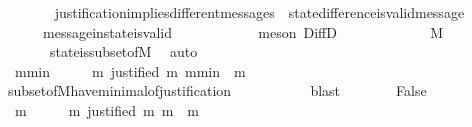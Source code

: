 \begin{isabellebody}
\ \ \ \ \ \ \isamarkupfalse%
\ justification{\isacharunderscore}implies{\isacharunderscore}different{\isacharunderscore}messages\ \ state{\isacharunderscore}difference{\isacharunderscore}is{\isacharunderscore}valid{\isacharunderscore}message\isanewline
\ \ \ \ \ \ message{\isacharunderscore}in{\isacharunderscore}state{\isacharunderscore}is{\isacharunderscore}valid\ \ {\isacartoucheopen}{\isasymsigma}{\isacharprime}\ {\isasymsubset}\ {\isasymsigma}{\isacartoucheclose}\isanewline
\ \ \ \ \ \ \isamarkupfalse%
\ {\isacharparenleft}meson\ DiffD{}\ {\isacartoucheopen}{\isasymsigma}\ {\isasymin}\ {\isasymSigma}{\isacartoucheclose}{\isacharparenright}\isanewline
\ \ \ \ \isamarkupfalse%
\ {\isachardoublequoteopen}{\isasymsigma}\ {\isacharminus}\ {\isasymsigma}{\isacharprime}\ {\isasymsubseteq}\ M{\isachardoublequoteclose}\isanewline
\ \ \ \ \ \ \isamarkupfalse%
\ {\isacartoucheopen}{\isasymsigma}\ {\isasymin}\ {\isasymSigma}{\isacartoucheclose}\ {\isacartoucheopen}{\isasymsigma}{\isacharprime}\ {\isasymsubset}\ {\isasymsigma}{\isacartoucheclose}\ state{\isacharunderscore}is{\isacharunderscore}subset{\isacharunderscore}of{\isacharunderscore}M\ \isamarkupfalse%
\ auto\isanewline
\ \ \ \ \isamarkupfalse%
\ \isamarkupfalse%
\ {\isachardoublequoteopen}{\isasymexists}\ m{\isacharunderscore}min\ {\isasymin}\ {\isasymsigma}\ {\isacharminus}\ {\isasymsigma}{\isacharprime}{\isachardot}\ {\isasymforall}\ m{\isachardot}\ justified\ m\ m{\isacharunderscore}min\ {\isasymlongrightarrow}\ m\ {\isasymnotin}\ {\isasymsigma}\ {\isacharminus}\ {\isasymsigma}{\isacharprime}{\isachardoublequoteclose}\isanewline
\ \ \ \ \ \ \isamarkupfalse%
\ subset{\isacharunderscore}of{\isacharunderscore}M{\isacharunderscore}have{\isacharunderscore}minimal{\isacharunderscore}of{\isacharunderscore}justification\ {\isacartoucheopen}{\isasymsigma}{\isacharprime}\ {\isasymsubset}\ {\isasymsigma}{\isacartoucheclose}\isanewline
\ \ \ \ \ \ \isamarkupfalse%
\ blast\isanewline
\ \ \ \ \isamarkupfalse%
\ \isamarkupfalse%
\ False\isanewline
\ \ \ \ \ \ \isamarkupfalse%
\ {\isacartoucheopen}{\isasymforall}\ m\ {\isasymin}\ {\isasymsigma}\ {\isacharminus}\ {\isasymsigma}{\isacharprime}{\isachardot}\ {\isasymexists}\ m{\isacharprime}{\isachardot}\ justified\ m{\isacharprime}\ m\ {\isasymand}\ m{\isacharprime}\ {\isasymin}\ {\isasymsigma}\ {\isacharminus}\ {\isasymsigma}{\isacharprime}{\isacartoucheclose}\ \isamarkupfalse%

\end{isabellebody}
